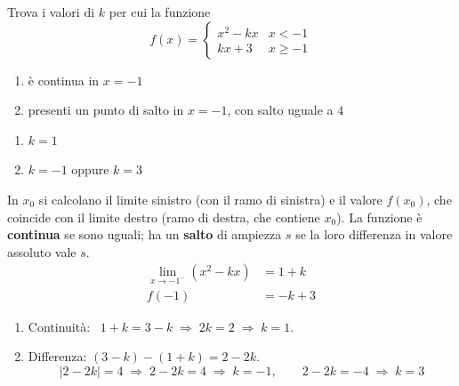 \begin{question}[ID=4.3, subtitle={Continuità e salto di $f$ con $x^2-kx$ e $kx+3$ in $x=-1$}, tags={continuità, parametrico}, difficulty=media]
Trova i valori di $k$ per cui la funzione
\[
f(x) = \begin{cases}
    x^2 - kx & x < -1 \\
    kx + 3 & x \ge -1
\end{cases}
\]
\begin{enumerate}
\item è continua in $x=-1$
\item presenti un punto di salto in $x=-1$, con salto uguale a $4$
\end{enumerate}
\begin{solution}
\begin{enumerate}
    \item $k=1$
    \item $k=-1$ oppure $k=3$
\end{enumerate}
\end{solution}
\begin{explanation}
In $x_0$ si calcolano il limite sinistro (con il ramo di sinistra) e il valore $f(x_0)$, che coincide con il limite destro (ramo di destra, che contiene $x_0$). La funzione è \textbf{continua} se sono uguali; ha un \textbf{salto} di ampiezza $s$ se la loro differenza in valore assoluto vale $s$.
\[\begin{aligned}
\lim_{x\to-1^-}(x^2-kx) &= 1+k\\
f(-1) &= -k+3
\end{aligned}\]
\begin{enumerate}
    \item Continuità: \ $1+k=3-k \;\Rightarrow\; 2k=2 \;\Rightarrow\; k=1$.
    \item Differenza: $(3-k)-(1+k)=2-2k$.
    \[ |2-2k|=4 \;\Rightarrow\; 2-2k=4 \;\Rightarrow\; k=-1, \qquad 2-2k=-4 \;\Rightarrow\; k=3 \]
\end{enumerate}
\end{explanation}
\end{question}


